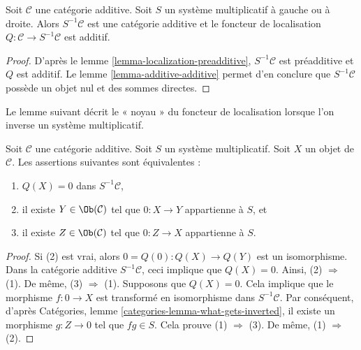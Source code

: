 \begin{lemma}
\label{lemma-localization-additive}
Soit $\mathcal{C}$ une catégorie additive.
Soit $S$ un système multiplicatif à gauche ou à droite.
Alors $S^{-1}\mathcal{C}$ est une catégorie additive et le foncteur de localisation
$Q : \mathcal{C} \to S^{-1}\mathcal{C}$ est additif.
\end{lemma}

\begin{proof}
D'après le lemme \ref{lemma-localization-preadditive},
$S^{-1}\mathcal{C}$ est préadditive et $Q$ est additif.
Le lemme \ref{lemma-additive-additive} permet d'en conclure que $S^{-1}\mathcal{C}$
possède un objet nul et des sommes directes.
\end{proof}

\noindent
Le lemme suivant décrit le « noyau »
du foncteur de localisation lorsque l'on inverse un système multiplicatif.

\begin{lemma}
\label{lemma-kernel-localization}
Soit $\mathcal{C}$ une catégorie additive. Soit $S$ un système
multiplicatif. Soit $X$ un objet
de $\mathcal{C}$. Les assertions suivantes sont équivalentes :
\begin{enumerate}
\item $Q(X) = 0$ dans $S^{-1}\mathcal{C}$,
\item il existe $Y \in \Ob(\mathcal{C})$ tel que
$0 : X \to Y$ appartienne à $S$, et
\item il existe $Z \in \Ob(\mathcal{C})$ tel que
$0 : Z \to X$ appartienne à $S$.
\end{enumerate}
\end{lemma}

\begin{proof}
Si (2) est vrai, alors $0 = Q(0) : Q(X) \to Q(Y)$ est un isomorphisme.
Dans la catégorie additive $S^{-1}\mathcal{C}$, ceci implique que $Q(X) = 0$.
Ainsi, (2) $\Rightarrow$ (1). De même, (3) $\Rightarrow$ (1).
Supposons que $Q(X) = 0$. Cela implique que le morphisme
$f : 0 \to X$ est transformé en isomorphisme dans $S^{-1}\mathcal{C}$.
Par conséquent, d'après
Catégories, lemme \ref{categories-lemma-what-gets-inverted},
il existe un morphisme $g : Z \to 0$ tel que $fg \in S$. Cela prouve
(1) $\Rightarrow$ (3). De même, (1) $\Rightarrow$ (2).
\end{proof}


